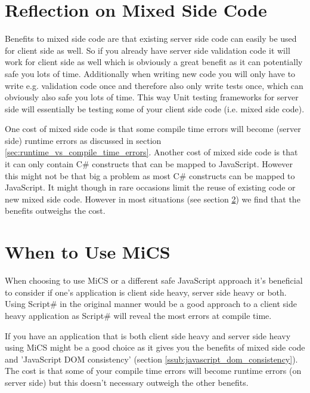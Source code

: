 
\section{Reflection on Mixed Side Code} %
\label{sec:reflection_on_mixed_side_code}
	Benefits to mixed side code are that existing server side code can easily be used for client side as well. So if you already have server side validation code it will work for client side as well which is obviously a great benefit as it can potentially safe you lots of time. Additionally when writing new code you will only have to write e.g. validation code once and therefore also only write tests once, which can obviously also safe you lots of time. This way Unit testing frameworks for server side will essentially be testing some of your client side code (i.e. mixed side code).

	One cost of mixed side code is that some compile time errors will become (server side) runtime errors as discussed in section \ref{sec:runtime_vs_compile_time_errors}. Another cost of mixed side code is that it can only contain C\# constructs that can be mapped to JavaScript. However this might not be that big a problem as most C\# constructs can be mapped to JavaScript. It might though in rare occasions limit the reuse of existing code or new mixed side code. However in most situations (see section \ref{sec:when_to_use_mics}) we find that the benefits outweighs the cost.


\section{When to Use MiCS} %
\label{sec:when_to_use_mics}
	When choosing to use MiCS or a different safe JavaScript approach it’s beneficial to consider if one’s application is client side heavy, server side heavy or both. Using Script\# in the original manner would be a good approach to a client side heavy application as Script\# will reveal the most errors at compile time. 

	If you have an application that is both client side heavy and server side heavy using MiCS might be a good choice as it gives you the benefits of mixed side code and 'JavaScript DOM consistency' (section \ref{ssub:javascript_dom_consistency}). The cost is that some of your compile time errors will become runtime errors (on server side) but this doesn’t necessary outweigh the other benefits. 

